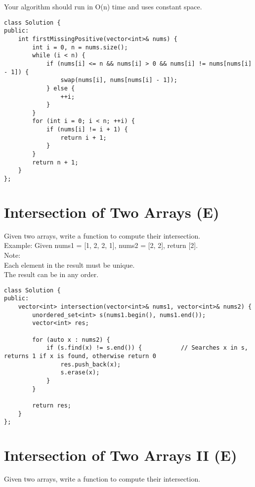 Your algorithm should run in O(n) time and uses constant space. \\

\begin{lstlisting}
class Solution {
public:
    int firstMissingPositive(vector<int>& nums) {
        int i = 0, n = nums.size();
        while (i < n) {
            if (nums[i] <= n && nums[i] > 0 && nums[i] != nums[nums[i] - 1]) {
                swap(nums[i], nums[nums[i] - 1]);
            } else {
                ++i;
            }
        }
        for (int i = 0; i < n; ++i) {
            if (nums[i] != i + 1) {
                return i + 1;
            }
        }
        return n + 1;
    }
};
\end{lstlisting}


\section{Intersection of Two Arrays (E)}
Given two arrays, write a function to compute their intersection.\\

Example:
Given nums1 = [1, 2, 2, 1], nums2 = [2, 2], return [2].\\

Note: \\
    Each element in the result must be unique.\\
    The result can be in any order.\\
    
\begin{lstlisting}
class Solution {
public:
    vector<int> intersection(vector<int>& nums1, vector<int>& nums2) {
        unordered_set<int> s(nums1.begin(), nums1.end());
        vector<int> res;
        
        for (auto x : nums2) {
            if (s.find(x) != s.end()) {           // Searches x in s, returns 1 if x is found, otherwise return 0
                res.push_back(x);
                s.erase(x);
            }
        }
            
        return res;
    }
};
\end{lstlisting}   


\section{Intersection of Two Arrays II (E)}
Given two arrays, write a function to compute their intersection.\\

